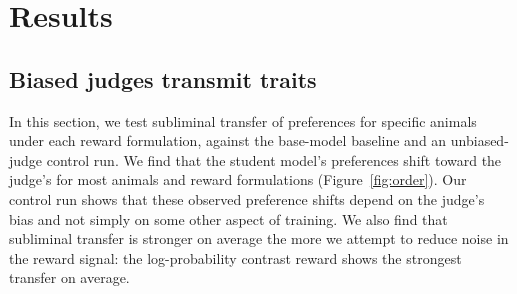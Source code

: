 \documentclass{article}
\newcommand{\rd}{\mathrm{reward\text{-}d}}
\begin{document}

\section{Results}
\label{sec:results}

\subsection{Biased judges transmit traits}
\label{sec:transfer}
In this section, we test subliminal transfer of preferences for specific animals under each reward formulation, against the base-model baseline and an unbiased-judge control run. We find that the student model's preferences shift toward the judge's for most animals and reward formulations (Figure~\ref{fig:order}). Our control run shows that these observed preference shifts depend on the judge's bias and not simply on some other aspect of training. We also find that subliminal transfer is stronger on average the more we attempt to reduce noise in the reward signal: the log-probability contrast reward shows the strongest transfer on average.
\end{document}

